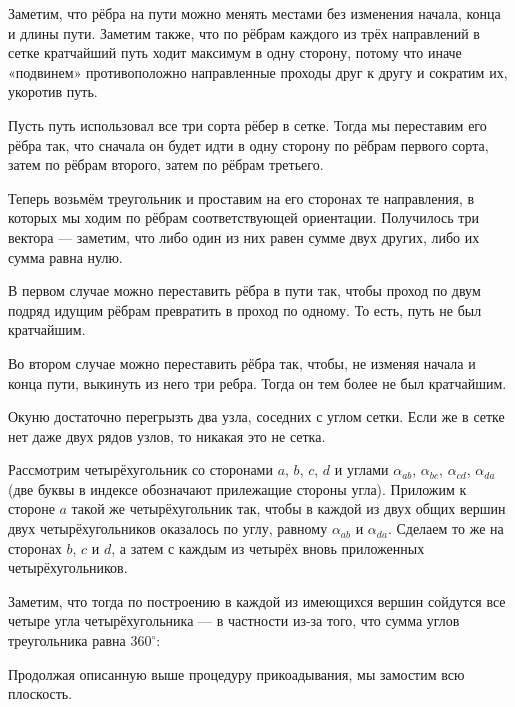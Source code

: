 \begin{itemize}

\itA Заметим, что рёбра на пути можно менять местами без изменения начала, конца и длины пути. Заметим также, что по рёбрам каждого из трёх направлений в сетке кратчайший путь ходит максимум в одну сторону, потому что иначе «подвинем» противоположно направленные проходы друг к другу и сократим их, укоротив путь.

Пусть путь использовал все три сорта рёбер в сетке. Тогда мы переставим его рёбра так, что сначала он будет идти в одну сторону по рёбрам первого сорта, затем по рёбрам второго, затем по рёбрам третьего.

Теперь возьмём треугольник и проставим на его сторонах те направления, в которых мы ходим по рёбрам соответствующей ориентации. Получилось три вектора — заметим, что либо один из них равен сумме двух других, либо их сумма равна нулю.

В первом случае можно переставить рёбра в пути так, чтобы проход по двум подряд идущим рёбрам превратить в проход по одному. То есть, путь не был кратчайшим.

Во втором случае можно переставить рёбра так, чтобы, не изменяя начала и конца пути, выкинуть из него три ребра. Тогда он тем более не был кратчайшим.

\itB Окуню достаточно перегрызть два узла, соседних с углом сетки. Если же в сетке нет даже двух рядов узлов, то никакая это не сетка.

\itC Рассмотрим четырёхугольник со сторонами $a$, $b$, $c$, $d$ и углами $\alpha_{ab}$, $\alpha_{bc}$, $\alpha_{cd}$, $\alpha_{da}$ (две буквы в индексе обозначают прилежащие стороны угла). Приложим к стороне $a$ такой же четырёхугольник так, чтобы в каждой из двух общих вершин двух четырёхугольников оказалось по углу, равному $\alpha_{ab}$ и $\alpha_{da}$. Сделаем то же на сторонах $b$, $c$ и $d$, а затем с каждым из четырёх вновь приложенных четырёхугольников.

Заметим, что тогда по построению в каждой из имеющихся вершин сойдутся все четыре угла четырёхугольника — в частности из-за того, что сумма углов треугольника равна $360^\circ$:

\begin{center}  \end{center}

Продолжая описанную выше процедуру прикоадывания, мы замостим всю плоскость.
\end{itemize}